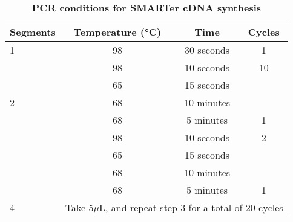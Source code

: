 \vspace{1cm}
\begin{table}[h]
	\centering
	\caption[PCR conditions for SMARTer cDNA synthesis]%
	{\textbf{PCR conditions for SMARTer cDNA synthesis}}
	\label{tab:PCR_condition_cdna_synthesis}
	\begin{tabularx}{0.8\textwidth}{lccc}
		\toprule
		Segments           & Temperature (°C)             & Time                  & Cycles            \\ \midrule
		1                  & 98                           & 30 seconds            & 1                 \\
		\multirow{5}{*}{2} & 98                           & 10 seconds            & 10                \\
		& 65                           & 15 seconds            &                   \\
		& 68                           & 10 minutes            &                   \\
		& 68                           & 5 minutes             & 1                 \\
		\multirow{4}{*}{3} & 98                           & 10 seconds            & 2                 \\
		& 65                           & 15 seconds            &                   \\
		& 68                           & 10 minutes            &                   \\
		& 68                           & 5 minutes             & 1                 \\
		4                  & \multicolumn{3}{c}{Take 5$\mu$L, and repeat step 3 for a total of 20 cycles} \\
		\bottomrule
	\end{tabularx}
\end{table}

\clearpage
